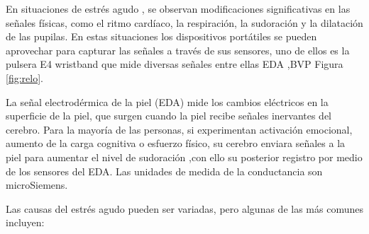 En situaciones de estrés agudo , se observan modificaciones significativas en las señales físicas, como el ritmo cardíaco, la respiración, la sudoración y la dilatación de las pupilas.
En estas situaciones  los dispositivos portátiles se pueden aprovechar para capturar las señales a través  de     sus  sensores, uno de ellos es la pulsera E4 wristband que mide  diversas señales entre ellas EDA ,BVP Figura \ref{fig:relo}.
 








 
La señal electrodérmica de la piel (EDA) mide  los cambios eléctricos en la superficie de la piel, que surgen cuando la piel recibe señales inervantes del cerebro. Para la mayoría de las personas, si experimentan activación emocional, aumento de la carga cognitiva o esfuerzo físico, su cerebro enviara señales a la piel para aumentar el nivel de sudoración ,con ello su posterior registro por medio de los sensores del EDA.
Las unidades de medida de la conductancia son microSiemens.



Las causas del estrés agudo pueden ser variadas, pero algunas de las más comunes incluyen:

